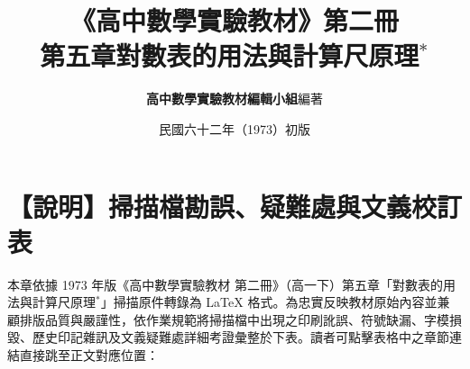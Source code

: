 \documentclass[a4paper,12pt,twoside]{article}
\title{\LARGE\textbf{《高中數學實驗教材》第二冊}\\[0.5em] \Large\textbf{第五章\quad 對數表的用法與計算尺原理$^*$}}
\author{\textbf{高中數學實驗教材編輯小組}\quad 編著}
\date{民國六十二年（1973）初版}
\begin{document}
\maketitle
\thispagestyle{firstpage}

\section*{【說明】掃描檔勘誤、疑難處與文義校訂表}
\label{sec:errata_notes}

本章依據 1973 年版《高中數學實驗教材 第二冊》（高一下）第五章「對數表的用法與計算尺原理$^*$」掃描原件轉錄為 \LaTeX{} 格式。為忠實反映教材原始內容並兼顧排版品質與嚴謹性，依作業規範將掃描檔中出現之印刷訛誤、符號缺漏、字模損毀、歷史印記雜訊及文義疑難處詳細考證彙整於下表。讀者可點擊表格中之章節連結直接跳至正文對應位置：
\end{document}
